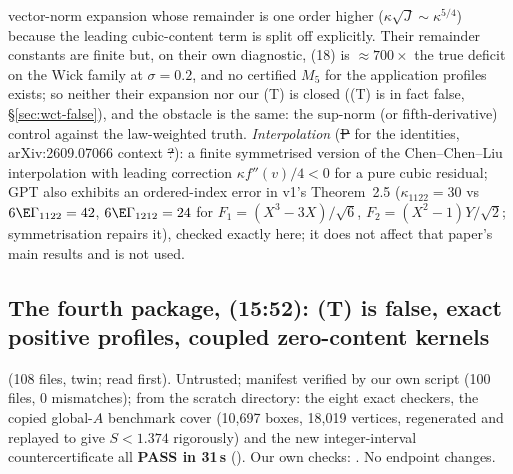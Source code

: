 vector-norm expansion whose remainder is one order higher ($\kappa\sqrt J\sim\kappa^{5/4}$) because the leading cubic-content term is split off explicitly. Their remainder constants are finite but,
on their own diagnostic, (18) is $\approx700\times$ the true deficit on the Wick family at $\sigma=0.2$, and no certified $M_5$ for the application profiles exists; so neither their expansion nor our
(T) is closed ((T) is in fact false, \S\ref{sec:wct-false}), and the obstacle is the same: the sup-norm (or fifth-derivative) control against the law-weighted truth. \emph{Interpolation} (\st{P} for the identities, arXiv:2609.07066 context
\st{?}): a finite symmetrised version of the Chen--Chen--Liu interpolation with leading correction $\kappa f''(v)/4<0$ for a pure cubic residual; GPT also exhibits an ordered-index error in
v1's Theorem~2.5 ($\kappa_{1122}=30$ vs $6\E\Gamma_{1122}=42$, $6\E\Gamma_{1212}=24$ for $F_1=(X^3-3X)/\sqrt6$, $F_2=(X^2-1)Y/\sqrt2$; symmetrisation repairs it), checked exactly here; it does not
affect that paper's main results and is not used.

\subsection{The fourth package,  (15:52): (T) is false, exact positive profiles, coupled zero-content kernels}\label{sec:kweighted}
 (108 files,  twin; read  first). Untrusted; manifest
 verified by our own script (100 files, 0 mismatches);  from the scratch directory: the eight exact checkers, the copied global-$A$ benchmark
cover (10,697 boxes, 18,019 vertices, regenerated and replayed to give $S<1.374$ rigorously) and the new integer-interval countercertificate all \textbf{PASS in 31\,s}
(). Our own checks: . No endpoint changes.

